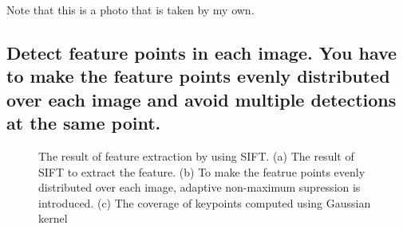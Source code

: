 \documentclass[10pt]{article}
\begin{document}
Note that this is a photo that is taken by my own.

\subsection*{Detect feature points in each image. You have to make the feature points evenly distributed over each image and avoid multiple detections at the same point.}
\begin{figure}[!h]
    \begin{center}
    \end{center}
    \caption{The result of feature extraction by using SIFT. (a) The result of SIFT to extract the feature. (b) To make the featrue points evenly distributed over each image, adaptive non-maximum supression is introduced. (c) The coverage of keypoints computed using Gaussian kernel}
    \label{fig3}
\end{figure}
\end{document}
